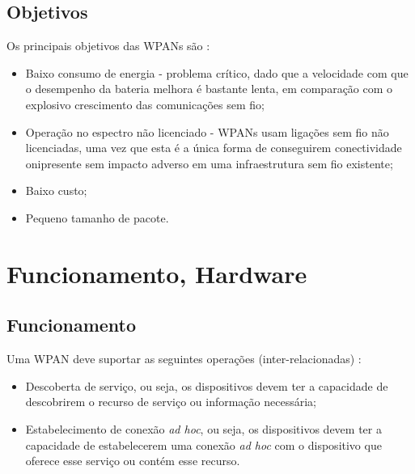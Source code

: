 \documentclass[conference]{IEEEtran}
\begin{document}
\subsection{Objetivos}

Os principais objetivos das WPANs são \cite{prasad2004ofdm}:

\begin{itemize}

 \item Baixo consumo de energia - problema crítico, dado que a velocidade com que o desempenho da bateria melhora é bastante lenta, em comparação com o explosivo crescimento das comunicações sem fio;
 \item Operação no espectro não licenciado - WPANs usam ligações sem fio não licenciadas, uma vez que esta é a única forma de conseguirem conectividade onipresente sem impacto adverso em uma infraestrutura sem fio existente;
 \item Baixo custo;
 \item Pequeno tamanho de pacote.
 
\end{itemize}




\section{Funcionamento, Hardware}

\subsection{Funcionamento}

Uma WPAN deve suportar as seguintes operações (inter-relacionadas) \cite{prasad2004ofdm}:

\begin{itemize}

 \item Descoberta de serviço, ou seja, os dispositivos devem ter a capacidade de descobrirem o recurso de serviço ou informação necessária;
 \item Estabelecimento de conexão \textit{ad hoc}, ou seja, os dispositivos devem ter a capacidade de estabelecerem uma conexão \textit{ad hoc} com o dispositivo que oferece esse serviço ou contém esse recurso.
 
\end{itemize}
\end{document}
